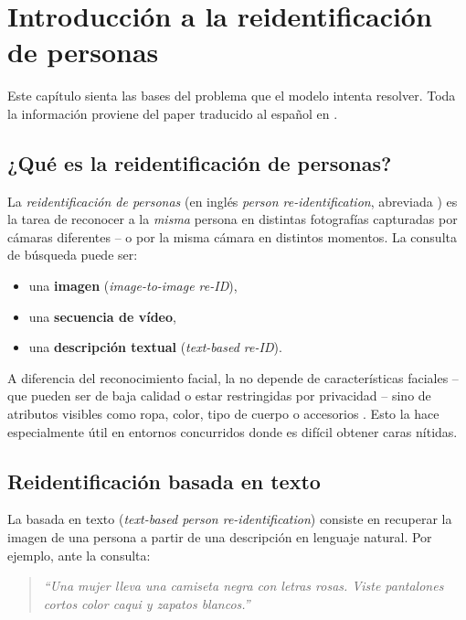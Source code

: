 \chapter{Introducción a la reidentificación de personas}
\label{cap:introduccion}

Este capítulo sienta las bases del problema que el modelo intenta
resolver. Toda la información proviene del paper traducido al español
en .

\section{¿Qué es la reidentificación de personas?}

La \emph{reidentificación de personas} (en inglés \emph{person
re-identification}, abreviada \reid{}) es la tarea de reconocer a la
\emph{misma} persona en distintas fotografías capturadas por cámaras
diferentes -- o por la misma cámara en distintos momentos. La consulta
de búsqueda puede ser:

\begin{itemize}
  \item una \textbf{imagen} (\emph{image-to-image re-ID}),
  \item una \textbf{secuencia de vídeo},
  \item una \textbf{descripción textual} (\emph{text-based re-ID}).
\end{itemize}

A diferencia del reconocimiento facial, la \reid{} no depende de
características faciales -- que pueden ser de baja calidad o estar
restringidas por privacidad -- sino de atributos visibles como ropa,
color, tipo de cuerpo o accesorios \cite{agyeman2024decentralized}.
Esto la hace especialmente útil en entornos concurridos donde es
difícil obtener caras nítidas.

\section{Reidentificación basada en texto}

La \reid{} basada en texto (\emph{text-based person re-identification})
consiste en recuperar la imagen de una persona a partir de una
descripción en lenguaje natural. Por ejemplo, ante la consulta:

\begin{quote}
\textit{``Una mujer lleva una camiseta negra con letras rosas. Viste
pantalones cortos color caqui y zapatos blancos.''}
\end{quote}

